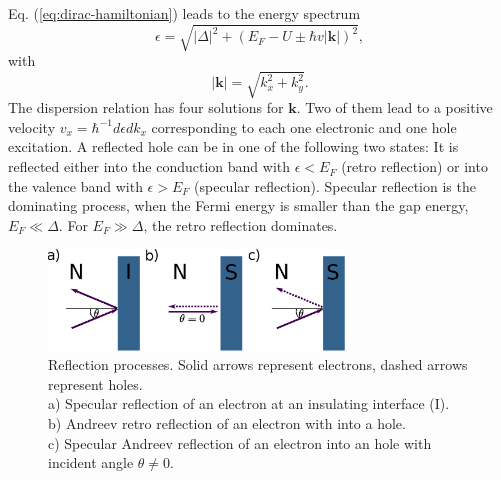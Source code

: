 Eq. (\ref{eq:dirac-hamiltonian}) leads to the energy spectrum
\begin{equation}
\epsilon = \sqrt{|\Delta|^2 + \left( E_F - U \pm \hbar v |\mathbf{k}|\right) ^2},  
\end{equation}
with
\begin{equation}
|\mathbf{k}| = \sqrt{k_x^2 + k_y^2}.
\end{equation}
The dispersion relation has four solutions for $\mathbf{k}$. Two of them lead to a positive velocity $v_x = \hbar^{-1} d \epsilon d k_x$ corresponding to each one electronic and one hole excitation. A reflected hole can be in one of the following two states: It is reflected either into the conduction band with $\epsilon < E_F$ (retro reflection) or into the valence band with $\epsilon > E_F$ (specular reflection). Specular reflection is the dominating process, when the Fermi energy is smaller than the gap energy, $E_F \ll \Delta$. For $E_F \gg \Delta$, the retro reflection dominates. 
\begin{figure}
\centering
\includegraphics[width=0.7\textwidth]{figure/framework-analytical/specular-reflection}
\caption{Reflection processes. Solid arrows represent electrons, dashed arrows represent holes. \\ a) Specular reflection of an electron at an insulating interface (I). \\ b) Andreev retro reflection of an electron with into a hole. \\ c) Specular Andreev reflection of an electron into an hole with incident angle $\theta \neq 0$.}\label{fig:specular-sns}
\end{figure}

 

